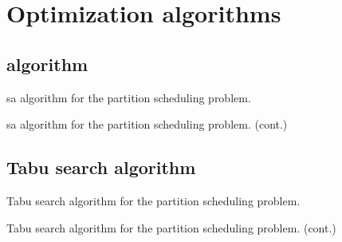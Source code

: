 \documentclass[main.tex]{subfiles}
\begin{document}
\chapter{Optimization algorithms}
\label{an:algs}

\section{ algorithm}
\label{an:sa}

\begin{algorithm}[H]
    \begin{algorithmic}[1]
    \end{algorithmic}
    \caption{\gls{sa} algorithm for the partition scheduling problem.}
    \label{alg:sa}
\end{algorithm}

\begin{algorithm}[H]
    \ContinuedFloat
    \begin{algorithmic}
    \end{algorithmic}
    \caption{\gls{sa} algorithm for the partition scheduling problem. (cont.)}
\end{algorithm}

\section{Tabu search algorithm}
\label{an:tabu}

\begin{algorithm}[H]
    \begin{algorithmic}[1]
    \end{algorithmic}
    \caption{Tabu search algorithm for the partition scheduling problem.}
    \label{alg:tabu}
\end{algorithm}

\begin{algorithm}[H]
    \ContinuedFloat
    \begin{algorithmic}
    \end{algorithmic}
    \caption{Tabu search algorithm for the partition scheduling problem. (cont.)}
\end{algorithm}
\end{document}
